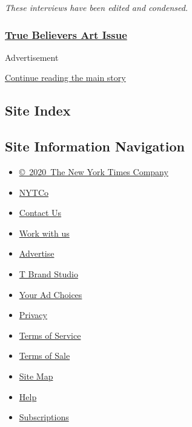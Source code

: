 \emph{These interviews have been edited and condensed.}

\hypertarget{true-believers-art-issue}{%
\subsubsection{\texorpdfstring{\href{https://www.nytimes3xbfgragh.onion/issue/t-magazine/2020/07/02/true-believers-art-issue}{True
Believers Art
Issue}}{True Believers Art Issue}}\label{true-believers-art-issue}}

Advertisement

\protect\hyperlink{after-bottom}{Continue reading the main story}

\hypertarget{site-index}{%
\subsection{Site Index}\label{site-index}}

\hypertarget{site-information-navigation}{%
\subsection{Site Information
Navigation}\label{site-information-navigation}}

\begin{itemize}
\tightlist
\item
  \href{https://help.nytimes3xbfgragh.onion/hc/en-us/articles/115014792127-Copyright-notice}{©~2020~The
  New York Times Company}
\end{itemize}

\begin{itemize}
\tightlist
\item
  \href{https://www.nytco.com/}{NYTCo}
\item
  \href{https://help.nytimes3xbfgragh.onion/hc/en-us/articles/115015385887-Contact-Us}{Contact
  Us}
\item
  \href{https://www.nytco.com/careers/}{Work with us}
\item
  \href{https://nytmediakit.com/}{Advertise}
\item
  \href{http://www.tbrandstudio.com/}{T Brand Studio}
\item
  \href{https://www.nytimes3xbfgragh.onion/privacy/cookie-policy\#how-do-i-manage-trackers}{Your
  Ad Choices}
\item
  \href{https://www.nytimes3xbfgragh.onion/privacy}{Privacy}
\item
  \href{https://help.nytimes3xbfgragh.onion/hc/en-us/articles/115014893428-Terms-of-service}{Terms
  of Service}
\item
  \href{https://help.nytimes3xbfgragh.onion/hc/en-us/articles/115014893968-Terms-of-sale}{Terms
  of Sale}
\item
  \href{https://spiderbites.nytimes3xbfgragh.onion}{Site Map}
\item
  \href{https://help.nytimes3xbfgragh.onion/hc/en-us}{Help}
\item
  \href{https://www.nytimes3xbfgragh.onion/subscription?campaignId=37WXW}{Subscriptions}
\end{itemize}
